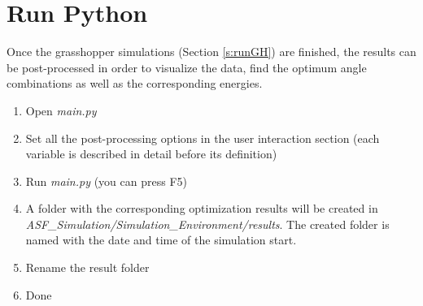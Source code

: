 \section{Run Python}

	Once the grasshopper simulations (Section \ref{s:runGH}) are finished, the results can be post-processed in order to visualize the data, find the optimum angle combinations as well as the corresponding energies. 

	\begin{enumerate}
	\item Open \emph{main.py}

	\item Set all the post-processing options in the user interaction section (each variable is described in detail before its definition)

	\item Run \emph{main.py} (you can press F5)

	\item A folder with the corresponding optimization results will be created in \emph{ASF\_Simulation/Simulation\_Environment/results}. The created folder is named with the date and time of the simulation start. 

	\item Rename the result folder

	\item Done
	\end{enumerate}
